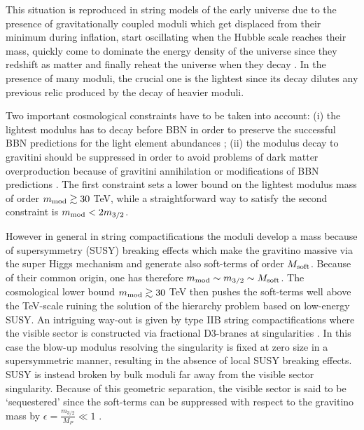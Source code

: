 \documentclass[11pt,a4paper]{article}
\begin{document}
This situation is reproduced in string models of the early universe due to the presence of gravitationally coupled moduli which get displaced from their minimum during inflation, start oscillating when the Hubble scale reaches their mass, quickly come to dominate the energy density of the universe since they redshift as matter and finally reheat the universe when they decay \cite{NTDM, NonThDMinSeqLVS}. In the presence of many moduli, the crucial one is the lightest since its decay dilutes any previous relic produced by the decay of heavier moduli.

Two important cosmological constraints have to be taken into account: (i) the lightest modulus has to decay before BBN in order to preserve the successful BBN predictions for the light element abundances \cite{CMP}; (ii) the modulus decay to gravitini should be suppressed in order to avoid problems of dark matter overproduction because of gravitini annihilation or modifications of BBN predictions \cite{gravProbl}. The first constraint sets a lower bound on the lightest modulus mass of order $m_{\rm mod} \gtrsim 30$ TeV, while a straightforward way to satisfy the second constraint is $m_{\rm mod}< 2 m_{3/2}$. 

However in general in string compactifications the moduli develop a mass because of supersymmetry (SUSY) breaking effects which make the gravitino massive via the super Higgs mechanism and generate also soft-terms of order $M_{\rm soft}$. Because of their common origin, one has therefore $m_{\rm mod}\sim m_{3/2}\sim M_{\rm soft}$. The cosmological lower bound $m_{\rm mod}\gtrsim 30$ TeV then pushes the soft-terms well above the TeV-scale ruining the solution of the hierarchy problem based on low-energy SUSY. An intriguing way-out is given by type IIB string compactifications where the visible sector is constructed via fractional D3-branes at singularities \cite{Aldazabal:2000sa, Conlon:2008wa, CYembedding}. In this case the blow-up modulus resolving the singularity is fixed at zero size in a supersymmetric manner, resulting in the absence of local SUSY breaking effects. SUSY is instead broken by bulk moduli far away from the visible sector singularity. Because of this geometric separation, the visible sector is said to be `sequestered' since the soft-terms can be suppressed with respect to the gravitino mass by $\epsilon = \frac{m_{3/2}}{M_P}\ll 1$ \cite{SeqLVS}. 
\end{document}
